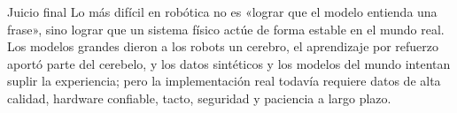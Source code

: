 \documentclass[a4paper]{article}
\begin{document}
\begin{importantbox}{Juicio final}
Lo más difícil en robótica no es «lograr que el modelo entienda una frase», sino lograr que un sistema físico actúe de forma estable en el mundo real. Los modelos grandes dieron a los robots un cerebro, el aprendizaje por refuerzo aportó parte del cerebelo, y los datos sintéticos y los modelos del mundo intentan suplir la experiencia; pero la implementación real todavía requiere datos de alta calidad, hardware confiable, tacto, seguridad y paciencia a largo plazo.
\end{importantbox}
\end{document}
